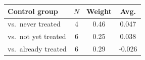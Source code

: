 \begin{tabular}{lccc}\toprule
Control group & $N$ & Weight & Avg. \\ \midrule
vs.\ never treated & 4 & 0.46 & 0.047 \\
vs.\ not yet treated & 6 & 0.25 & 0.038 \\
vs.\ already treated & 6 & 0.29 & -0.026 \\
\bottomrule\end{tabular}
